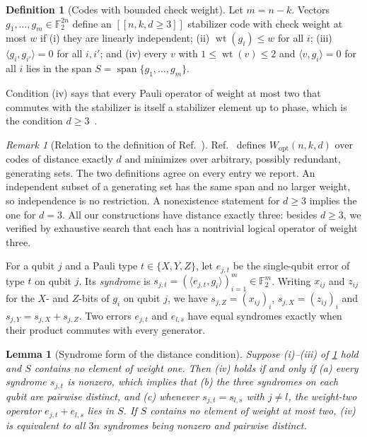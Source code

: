 \documentclass[a4paper,onecolumn,unpublished]{quantumarticle}
\newtheorem{lemma}[theorem]{Lemma}
\theoremstyle{definition}
\newtheorem{definition}{Definition}
\theoremstyle{remark}
\newtheorem{remark}[theorem]{Remark}
\newcommand{\F}{\mathbb{F}_2}
\newcommand{\wt}{\operatorname{wt}}
\newcommand{\Wopt}{W_{\mathrm{opt}}}
\newcommand{\spn}{\operatorname{span}}
\newcommand{\qc}[1]{[\![#1]\!]}
\begin{document}
\begin{definition}[Codes with bounded check weight]
\label{def:code}
Let $m=n-k$. Vectors $g_1,\dots,g_m\in\F^{2n}$ define an $\qc{n,k,d\ge3}$ stabilizer code with
check weight at most $w$ if (i) they are linearly independent; (ii) $\wt(g_i)\le w$ for all $i$;
(iii) $\langle g_i,g_{i'}\rangle=0$ for all $i,i'$; and (iv) every $v$ with $1\le\wt(v)\le2$ and
$\langle v,g_i\rangle=0$ for all $i$ lies in the span $S=\spn\{g_1,\dots,g_m\}$.
\end{definition}

Condition (iv) says that every Pauli operator of weight at most two that commutes with the
stabilizer is itself a stabilizer element up to phase, which is the condition $d\ge3$~\cite{KL97}.

\begin{remark}[Relation to the definition of Ref.~\cite{WHHLL26}]
\label{rem:def}
Ref.~\cite{WHHLL26} defines $\Wopt(n,k,d)$ over codes of distance exactly $d$ and minimizes over
arbitrary, possibly redundant, generating sets. The two definitions agree on every entry we
report. An independent subset of a generating set has the same span and no larger weight, so
independence is no restriction. A nonexistence statement for $d\ge3$ implies the one for $d=3$.
All our constructions have distance exactly three: besides $d\ge3$, we verified by exhaustive
search that each has a nontrivial logical operator of weight three.
\end{remark}

For a qubit $j$ and a Pauli type $t\in\{X,Y,Z\}$, let $e_{j,t}$ be the single-qubit error of type
$t$ on qubit $j$. Its \emph{syndrome} is $s_{j,t}=(\langle e_{j,t},g_i\rangle)_{i=1}^m\in\F^m$.
Writing $x_{ij}$ and $z_{ij}$ for the $X$- and $Z$-bits of $g_i$ on qubit $j$, we have
$s_{j,Z}=(x_{ij})_i$, $s_{j,X}=(z_{ij})_i$ and $s_{j,Y}=s_{j,X}+s_{j,Z}$. Two errors $e_{j,t}$ and
$e_{l,s}$ have equal syndromes exactly when their product commutes with every generator.

\begin{lemma}[Syndrome form of the distance condition]
\label{lem:syndrome}
Suppose (i)--(iii) of \cref{def:code} hold and $S$ contains no element of weight one. Then (iv)
holds if and only if (a) every syndrome $s_{j,t}$ is nonzero, which implies that (b) the three
syndromes on each qubit are pairwise distinct, and (c) whenever $s_{j,t}=s_{l,s}$ with $j\ne l$, the weight-two operator
$e_{j,t}+e_{l,s}$ lies in $S$. If $S$ contains no element of weight at most two, (iv) is equivalent
to all $3n$ syndromes being nonzero and pairwise distinct.
\end{lemma}
\end{document}
